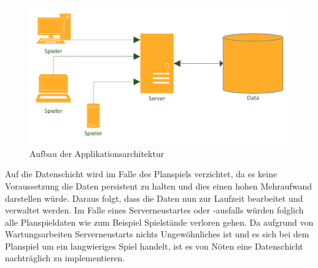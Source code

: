 \begin{figure}[h]
	\centering	\includegraphics[width=\textwidth]{img/architektur}
	\captionsetup{format=hang}
	\caption{
		\label{abb:architektur}Aufbau der Applikationsarchitektur}
\end{figure}

 Auf die Datenschicht wird im Falle des Planspiels verzichtet, da es keine Voraussetzung die Daten persistent zu halten und dies einen hohen Mehraufwand darstellen würde. Daraus folgt, dass die Daten nun zur Laufzeit bearbeitet und verwaltet werden.
 Im Falle eines Serverneustartes oder -ausfalls würden folglich alle Planspieldaten wie zum Beispiel Spielstände verloren gehen. Da aufgrund von Wartungsarbeiten Serverneustarts nichts Ungewöhnliches ist und es sich bei dem Planspiel um ein langwieriges Spiel handelt, ist es von Nöten eine Datenschicht nachträglich zu implementieren. 
